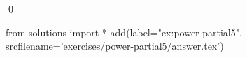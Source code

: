 
\begin{ex} 
  \label{ex:power-partial5}
  
  \qed
\end{ex} 
\begin{python0}
from solutions import *
add(label="ex:power-partial5",
    srcfilename='exercises/power-partial5/answer.tex') 
\end{python0}
